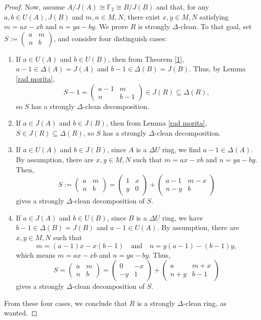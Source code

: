 \documentclass[12pt]{amsart}
\theoremstyle{definition}
\begin{document}
\begin{proof}
Now, assume $A/J(A) \cong  \mathbb{F}_2  \cong B/J(B)$ and that, for any $a,b \in U(A),J(B)$ and $m,n \in M,N$, there exist $x,y \in M,N$ satisfying $m=ax-xb$ and $n=ya-by$. We prove $R$ is strongly $\Delta$-clean. To that goal, set $S :=\begin{pmatrix}
a & m \\
n & b
\end{pmatrix}$, and consider four distinguish cases:

\begin{enumerate}
\item If $a \in U(A)$ and $b \in U(B)$, then from Theorem \ref{1}, $a-1\in \Delta(A)=J(A)$ and $b-1 \in \Delta(B)=J(B)$. Thus, by Lemma \ref{rad morita},
\[
S-1 = \begin{pmatrix}
a-1 & m \\
n & b-1
\end{pmatrix} \in J(R) \subseteq \Delta(R),
\]
so $S$ has a strongly $\Delta$-clean decomposition.

\item If $a \in J(A)$ and $b \in J(B)$, then from Lemma \ref{rad morita}, $S \in J(R)\subseteq \Delta(R)$, so $S$ has a strongly $\Delta$-clean decomposition.

\item If $a \in U(A)$ and $b \in J(B)$, since $A$ is a $\Delta U$ ring, we find $a-1 \in \Delta(A)$. By assumption, there are $x,y \in M,N$ such that $m=ax-xb$ and $n=ya-by$. Then,
\[
S := \begin{pmatrix}
a & m \\
n & b
\end{pmatrix} = \begin{pmatrix}
1 & x \\
y & 0
\end{pmatrix} + \begin{pmatrix}
a-1 & m-x \\
n-y & b
\end{pmatrix}
\]
gives a strongly $\Delta$-clean decomposition of $S$.

\item If $a \in J(A)$ and $b \in U(B)$, since $B$ is a $\Delta U$ ring, we have $b-1 \in \Delta(B)=J(B)$ and $a-1 \in U(A)$. By assumption, there are $x,y \in M,N$ such that
\[
m = (a-1)x - x(b-1) \quad \text{and} \quad n = y(a-1) - (b-1)y,
\]
which means $m=ax-xb$ and $n=ya-by$. Thus,
\[
S = \begin{pmatrix}
a & m \\
n & b
\end{pmatrix} = \begin{pmatrix}
0 & -x \\
-y & 1
\end{pmatrix} + \begin{pmatrix}
a & m+x \\
n+y & b-1
\end{pmatrix}
\]
gives a strongly $\Delta$-clean decomposition of $S$.
\end{enumerate}

From these four cases, we conclude that $R$ is a strongly $\Delta$-clean ring, as wanted.
\end{proof}
\end{document}

